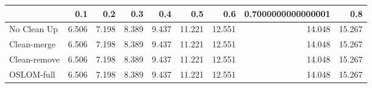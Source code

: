 \begin{tabular}{lrrrrrrrr}
\toprule
{} &   0.1 &   0.2 &   0.3 &   0.4 &    0.5 &    0.6 & 0.7000000000000001 &    0.8 \\
\midrule
No Clean Up  & 6.506 & 7.198 & 8.389 & 9.437 & 11.221 & 12.551 &             14.048 & 15.267 \\
Clean-merge  & 6.506 & 7.198 & 8.389 & 9.437 & 11.221 & 12.551 &             14.048 & 15.267 \\
Clean-remove & 6.506 & 7.198 & 8.389 & 9.437 & 11.221 & 12.551 &             14.048 & 15.267 \\
OSLOM-full   & 6.506 & 7.198 & 8.389 & 9.437 & 11.221 & 12.551 &             14.048 & 15.267 \\
\bottomrule
\end{tabular}
